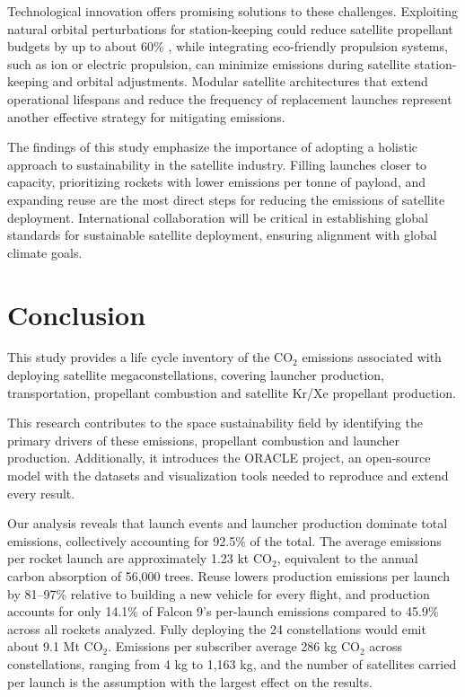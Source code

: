 \documentclass[pdflatex,sn-mathphys-num]{sn-jnl}
\theoremstyle{thmstyleone}%
\theoremstyle{thmstyletwo}%
\theoremstyle{thmstylethree}%
\begin{document}
Technological innovation offers promising solutions to these challenges. Exploiting natural orbital perturbations for station-keeping could reduce satellite propellant budgets by up to about 60\% \citep{singh_low_2020}, while integrating eco-friendly propulsion systems, such as ion or electric propulsion, can minimize emissions during satellite station-keeping and orbital adjustments. Modular satellite architectures that extend operational lifespans and reduce the frequency of replacement launches represent another effective strategy for mitigating emissions.

The findings of this study emphasize the importance of adopting a holistic approach to sustainability in the satellite industry. Filling launches closer to capacity, prioritizing rockets with lower emissions per tonne of payload, and expanding reuse are the most direct steps for reducing the emissions of satellite deployment. International collaboration will be critical in establishing global standards for sustainable satellite deployment, ensuring alignment with global climate goals.

\section{Conclusion}\label{sec7}

This study provides a life cycle inventory of the CO$_2$ emissions associated with deploying satellite megaconstellations, covering launcher production, transportation, propellant combustion and satellite Kr/Xe propellant production.

This research contributes to the space sustainability field by identifying the primary drivers of these emissions, propellant combustion and launcher production. Additionally, it introduces the ORACLE project, an open-source model with the datasets and visualization tools needed to reproduce and extend every result.

Our analysis reveals that launch events and launcher production dominate total emissions, collectively accounting for 92.5\% of the total. The average emissions per rocket launch are approximately 1.23 kt CO$_2$, equivalent to the annual carbon absorption of 56,000 trees. Reuse lowers production emissions per launch by 81--97\% relative to building a new vehicle for every flight, and production accounts for only 14.1\% of Falcon 9's per-launch emissions compared to 45.9\% across all rockets analyzed. Fully deploying the 24 constellations would emit about 9.1 Mt CO$_2$. Emissions per subscriber average 286 kg CO$_2$ across constellations, ranging from 4 kg to 1,163 kg, and the number of satellites carried per launch is the assumption with the largest effect on the results.
\end{document}
